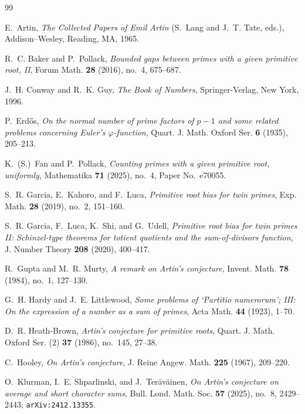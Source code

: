 \documentclass[11pt,reqno]{amsart}
\theoremstyle{plain}
\theoremstyle{definition}
\begin{document}
\begin{thebibliography}{99}

	E.~Artin,
	\emph{The Collected Papers of Emil Artin} (S.~Lang and J.~T. Tate, eds.),
	Addison--Wesley, Reading, MA, 1965.

	R.~C. Baker and P.~Pollack,
	\emph{Bounded gaps between primes with a given primitive root, II},
	Forum Math. \textbf{28} (2016), no.~4, 675--687.

	J.~H. Conway and R.~K. Guy,
	\emph{The Book of Numbers},
	Springer-Verlag, New York, 1996.

	P.~Erd\H{o}s,
	\emph{On the normal number of prime factors of $p-1$ and some related problems
		concerning Euler's $\varphi$-function},
	Quart. J. Math. Oxford Ser. \textbf{6} (1935), 205--213.

	K.~(S.)~Fan and P.~Pollack,
	\emph{Counting primes with a given primitive root, uniformly},
	Mathematika \textbf{71} (2025), no.~4, Paper No.~e70055.

	S.~R. Garcia, E.~Kahoro, and F.~Luca,
	\emph{Primitive root bias for twin primes},
	Exp. Math. \textbf{28} (2019), no.~2, 151--160.

	S.~R. Garcia, F.~Luca, K.~Shi, and G.~Udell,
	\emph{Primitive root bias for twin primes II: Schinzel-type theorems for
		totient quotients and the sum-of-divisors function},
	J. Number Theory \textbf{208} (2020), 400--417.

	R.~Gupta and M.~R. Murty,
	\emph{A remark on Artin's conjecture},
	Invent. Math. \textbf{78} (1984), no.~1, 127--130.

	G.~H. Hardy and J.~E. Littlewood,
	\emph{Some problems of `Partitio numerorum'; III: On the expression of a
		number as a sum of primes},
	Acta Math. \textbf{44} (1923), 1--70.

	D.~R. Heath-Brown,
	\emph{Artin's conjecture for primitive roots},
	Quart. J. Math. Oxford Ser. (2) \textbf{37} (1986), no.~145, 27--38.

	C.~Hooley,
	\emph{On Artin's conjecture},
	J. Reine Angew. Math. \textbf{225} (1967), 209--220.

	O.~Klurman, I.~E. Shparlinski, and J.~Ter\"av\"ainen,
	\emph{On Artin's conjecture on average and short character sums},
	Bull. Lond. Math. Soc. \textbf{57} (2025), no.~8, 2429--2443;
	\texttt{arXiv:2412.13355}.


\end{thebibliography}
\end{document}
